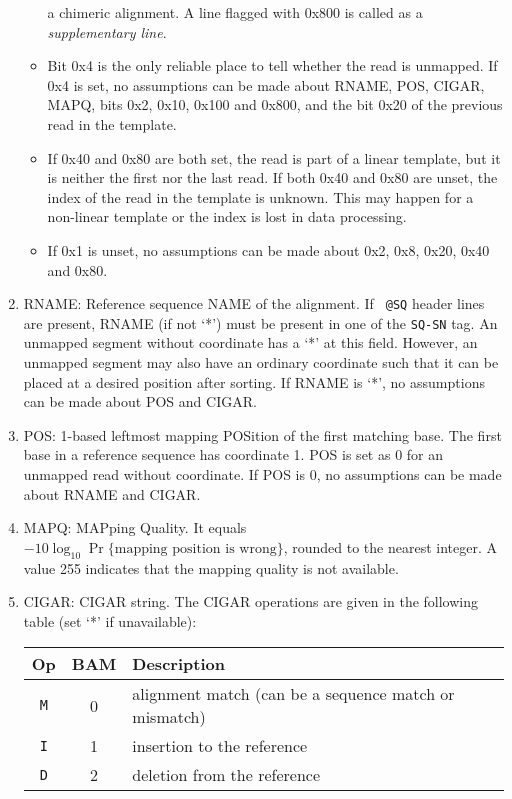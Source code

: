 \documentclass[10pt]{article}
\begin{document}
\begin{enumerate}
\begin{itemize}
    a chimeric alignment. A line flagged with 0x800 is called as a \emph{supplementary line}.
  \item Bit 0x4 is the only reliable place to tell whether the read
    is unmapped. If 0x4 is set, no assumptions can be made about {\sf
      RNAME}, {\sf POS}, {\sf CIGAR}, {\sf MAPQ}, bits 0x2, 0x10, 0x100
    and 0x800, and the bit 0x20 of the previous read in the template.
  \item If 0x40 and 0x80 are both set, the read is part of a linear
    template, but it is neither the first nor the last read. If both
    0x40 and 0x80 are unset, the index of the read in the template
    is unknown. This may happen for a non-linear template or the index
    is lost in data processing.
  \item If 0x1 is unset, no assumptions can be made about 0x2, 0x8,
    0x20, 0x40 and 0x80.
  \end{itemize}
\item {\sf RNAME}: Reference sequence NAME of the alignment. If {\tt
    @SQ} header lines are present, {\sf RNAME} (if not `*') must be
  present in one of the {\tt SQ-SN} tag. An unmapped segment without
  coordinate has a `*' at this field. However, an unmapped segment may
  also have an ordinary coordinate such that it can be placed at a
  desired position after sorting. If {\sf RNAME} is `*', no assumptions
  can be made about {\sf POS} and {\sf CIGAR}.
\item {\sf POS}: 1-based leftmost mapping POSition of the first matching
  base. The first base in a reference sequence has coordinate 1. {\sf
    POS} is set as 0 for an unmapped read without coordinate. If {\sf
    POS} is 0, no assumptions can be made about {\sf RNAME} and {\sf
    CIGAR}.
\item {\sf MAPQ}: MAPping Quality. It equals
  $-10\log_{10}\Pr\{\mbox{mapping position is wrong}\}$, rounded to the
  nearest integer. A value 255 indicates that the mapping quality is not
  available.
\item {\sf CIGAR}: CIGAR string. The CIGAR operations are given in the
  following table (set `*' if unavailable):
  \begin{center}\small
  \begin{tabular}{ccl}
  \hline
  Op & BAM & Description\\
  \hline
  {\tt M} & 0 & alignment match (can be a sequence match or mismatch)\\
  {\tt I} & 1 & insertion to the reference \\
  {\tt D} & 2 & deletion from the reference \\

\end{tabular}
\end{center}
\end{enumerate}
\end{document}
